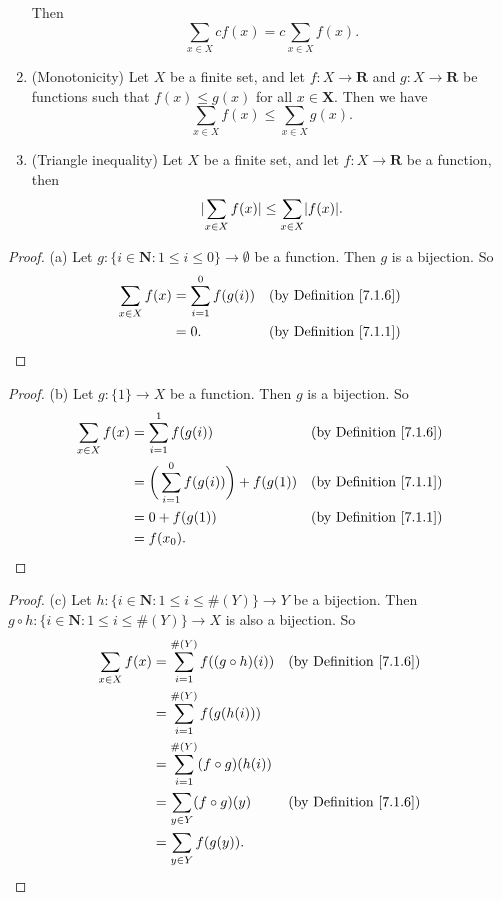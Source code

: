 \begin{proposition}
\begin{enumerate}
    Then
    \[
        \sum_{x \in X} cf(x) = c\sum_{x \in X} f(x).
    \]
    \item (Monotonicity) Let \(X\) be a finite set, and let \(f : X \to \mathbf{R}\) and \(g : X \to \mathbf{R}\) be functions such that \(f(x) \leq g(x)\) for all \(x \in \mathbf{X}\).
    Then we have
    \[
        \sum_{x \in X} f(x) \leq \sum_{x \in X} g(x).
    \]
    \item (Triangle inequality) Let \(X\) be a finite set, and let \(f : X \to \mathbf{R}\) be a function, then
    \[
        \lvert\sum_{x \in X} f(x)\rvert \leq \sum_{x \in X} \lvert f(x)\rvert.
    \]
    \end{enumerate}
\end{proposition}

\begin{proof}{(a)}
Let \(g : \{i \in \mathbf{N} : 1 \leq i \leq 0\} \to \emptyset\) be a function.
Then \(g\) is a bijection.
So
\begin{align*}
\sum_{x \in X} f(x) &= \sum_{i = 1}^0 f(g(i)) & \text{(by Definition \ref{7.1.6})} \\
&= 0. & \text{(by Definition \ref{7.1.1})}
\end{align*}
\end{proof}

\begin{proof}{(b)}
Let \(g : \{1\} \to X\) be a function.
Then \(g\) is a bijection.
So
\begin{align*}
\sum_{x \in X} f(x) &= \sum_{i = 1}^1 f(g(i)) & \text{(by Definition \ref{7.1.6})} \\
&= \bigg(\sum_{i = 1}^0 f(g(i))\bigg) + f(g(1)) & \text{(by Definition \ref{7.1.1})} \\
&= 0 + f(g(1)) & \text{(by Definition \ref{7.1.1})} \\
&= f(x_0).
\end{align*}
\end{proof}

\begin{proof}{(c)}
Let \(h : \{i \in \mathbf{N} : 1 \leq i \leq \#(Y)\} \to Y\) be a bijection.
Then \(g \circ h : \{i \in \mathbf{N} : 1 \leq i \leq \#(Y)\} \to X\) is also a bijection.
So
\begin{align*}
\sum_{x \in X} f(x) &= \sum_{i = 1}^{\#(Y)} f((g \circ h)(i)) & \text{(by Definition \ref{7.1.6})} \\
&= \sum_{i = 1}^{\#(Y)} f(g(h(i))) \\
&= \sum_{i = 1}^{\#(Y)} (f \circ g)(h(i)) \\
&= \sum_{y \in Y} (f \circ g)(y) & \text{(by Definition \ref{7.1.6})} \\
&= \sum_{y \in Y} f(g(y)).
\end{align*}
\end{proof}

